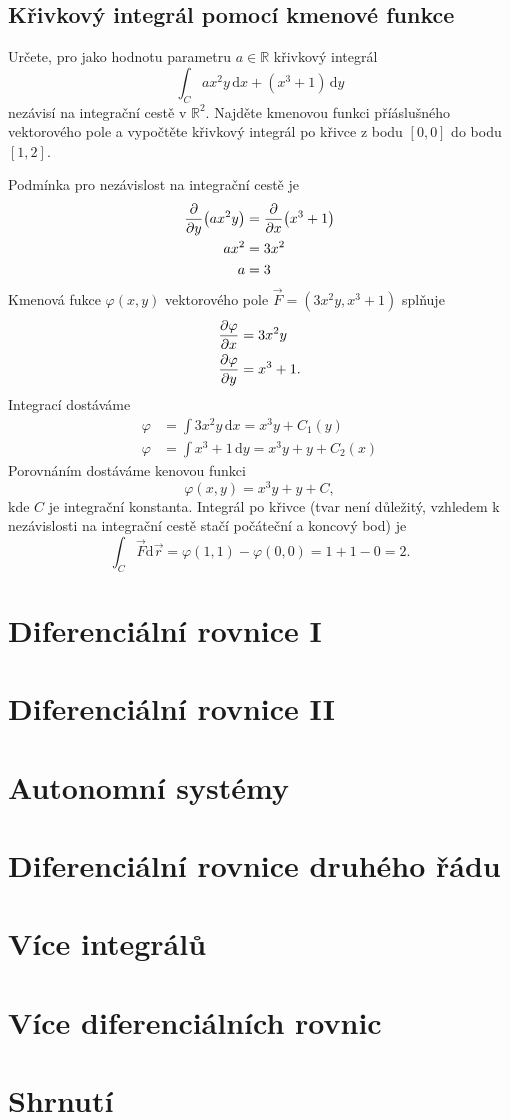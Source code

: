 \subsection{Křivkový integrál pomocí kmenové funkce}

Určete, pro jako hodnotu parametru $a\in \mathbb R$ křivkový integrál $$\int_C ax^2y\,\mathrm dx+(x^3+1)\,\mathrm dy$$ nezávisí na integrační cestě v $\mathbb R^2$. Najděte kmenovou funkci příáslušného vektorového pole a vypočtěte křivkový integrál po křivce z bodu $[0,0]$ do bodu $[1,2]$.

\reseni

Podmínka pro nezávislost na integrační cestě je $$
\begin{aligned}
  \pdv{y}(ax^2y)&=\pdv{x}(x^3+1)\\
  ax^2&=3x^2\\
  a&=3
\end{aligned}
$$
Kmenová fukce $\varphi(x,y)$ vektorového pole $\vec F=(3x^2y,x^3+1)$ splňuje
$$
\begin{aligned}
  \pdv{\varphi}{x}&=3x^2y \\  \pdv{\varphi}{y}&=x^3+1.
\end{aligned}
$$
Integrací dostáváme
$$
\begin{aligned}
  \varphi &= \int 3x^2y\,\mathrm dx=x^3y+C_1(y)\\
  \varphi &= \int x^3+1\,\mathrm dy=x^3y+y+C_2(x)
\end{aligned}
$$
Porovnáním dostáváme kenovou funkci $$\varphi (x,y)=x^3y+y+C,$$ kde $C$ je integrační konstanta. Integrál po křivce (tvar není důležitý, vzhledem k nezávislosti na integrační cestě stačí počáteční a koncový bod) je
$$\int _C \vec F\mathrm d\vec r=\varphi(1,1)-\varphi(0,0)=1+1-0=2.$$

\konec


\section{Diferenciální rovnice I}

\section{Diferenciální rovnice II}

\section{Autonomní systémy}

\section{Diferenciální rovnice druhého řádu}

\section{Více integrálů}

\section{Více diferenciálních rovnic}

\section{Shrnutí}






